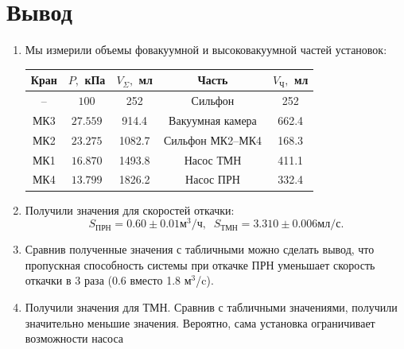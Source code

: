 \documentclass[a4paper,12pt]{article}
\begin{document}
\section{Вывод}
\begin{enumerate}
\itemsep0em
\item Мы измерили объемы фовакуумной и высоковакуумной частей установок:
\begin{center}
\begin{tabular}{|c|c|c|c|c|}
\hline 
Кран & $P, $ кПа & $V_\Sigma, $ мл & Часть & $V_\text{Ч}, $ мл \\ 
\hline 
-- & $100$ & 252 & Сильфон & 252 \\ 
\hline 
МК3 & $27.559$ & 914.4 & Вакуумная камера & 662.4 \\ 
\hline 
МК2 & $23.275$ & 1082.7 & Сильфон МК2--МК4 & 168.3 \\ 
\hline 
МК1 & $16.870$ & 1493.8 & Насос ТМН & 411.1 \\ 
\hline 
МК4 & $13.799$ & 1826.2 & Насос ПРН & 332.4 \\ 
\hline 
\end{tabular} 
\end{center}
\item Получили значения для скоростей откачки:
\[
S_\text{ПРН} = 0.60 \pm 0.01 \text{м}^3/\text{ч}, \;\; S_\text{ТМН} = 3.310 \pm 0.006 \text{мл/с}.
\]

\item
Сравнив полученные значения с табличными можно сделать вывод, что пропускная способность системы при откачке ПРН уменьшает скорость откачки в 3 раза (0.6 вместо 1.8 м$^3$/c).
\item 
Получили значения для ТМН. Сравнив с табличными значениями, получили значительно меньшие значения. Вероятно, сама установка ограничивает возможности насоса 
\end{enumerate}
\end{document}
